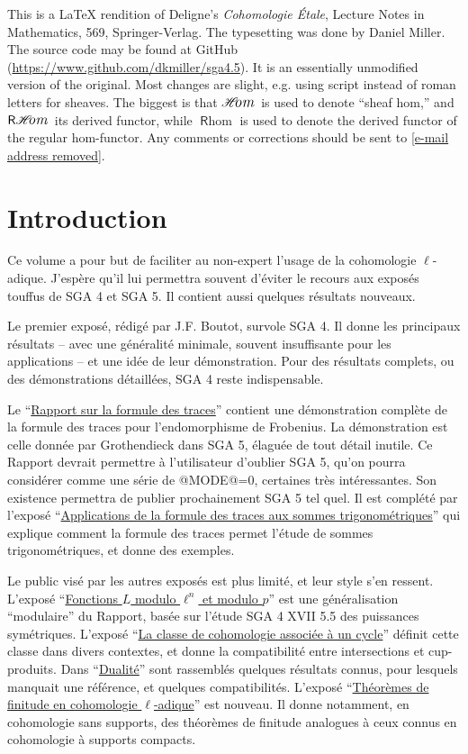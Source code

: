 \documentclass[oneside]{book}
\makeatletter
\providecommand\calligra{\itshape}}
\DeclareMathOperator{\Hom}{\mathscr{H}\text{\kern -3pt {\calligra\large om}}\,} %
\DeclareMathOperator{\rHom}{\mathsf{R}\vspace{-1pt}\mathscr{H}\text{\kern -3pt {\calligra\large om}}\,}
\DeclareMathOperator{\rhom}{\mathsf{R}\hom}
\theoremstyle{sga-source}
\theoremstyle{sga-source-dash}
\theoremstyle{sga-source-dotdash}
\theoremstyle{sga-source-number-note-dash}
\theoremstyle{sga-source-note-number-dotdash}
\theoremstyle{sga-source-example-dotdash}
\theoremstyle{sga-source-inline-number}
\theoremstyle{sga-source-bare-number}
\theoremstyle{sga-source}
\providecommand\EditionMode{@MODE@}
\providecommand\EditionLanguage{fr}
\DeclareRobustCommand{\EditionVariantMark}[2]{%
  \ifx\relax#1\relax\else
    \ifmmode
      \hbox{\raisebox{0.7ex}{\normalfont\scriptsize\color{EditionAppColor}%
        \hyperlink{apparatus:#1}{\EditionShortOccurrence{#1}}}}%
    \else
      \textsuperscript{\normalfont\scriptsize\color{EditionAppColor}%
        \hyperlink{apparatus:#1}{\EditionShortOccurrence{#1}}}%
    \fi
  \fi}
\def\EditionShortOccurrence#1{\expandafter\EditionShortOccurrenceAux#1\@nil}
\def\EditionShortOccurrenceAux#1-#2\@nil{\number#2\relax}
\DeclareRobustCommand{\var}[4][]{%
  \ifnum\EditionMode=0\relax
    \expandafter\@firstoftwo
  \else
    \expandafter\@secondoftwo
  \fi
  {#2}{\ifnum\EditionMode=1\relax\EditionVariantMark{#1}{#4}\fi#3}}
\providecommand\CurrentPrintPage{}
\DeclareRobustCommand{\PrintPage}[1]{%
  \gdef\CurrentPrintPage{#1}%
  \hypertarget{printpage:\EditionLanguage:#1}{}%
  \marginnote{\normalfont\sffamily\scriptsize\color{black!65}%
    \ifnum\EditionMode=2\relax#1\else[p.~#1]\fi}}
\DeclareRobustCommand{\MathPage}[1]{\PrintPage{#1}}
\def\EditionPDFVar[#1]#2#3#4{\ifnum\EditionMode=0\relax\expandafter\@firstoftwo\else\expandafter\@secondoftwo\fi{#2}{#3}}
\let\var\EditionPDFVar
\def\PrintPage#1{}\def\MathPage#1{}%
\def\EditionVariantMark#1#2{}}
\makeatother
\begin{document}
This is a \LaTeX{} rendition of Deligne's \emph{Cohomologie \'Etale}, Lecture 
Notes in Mathematics, 569, Springer-Verlag. The 
typesetting was done by Daniel Miller. The source code may be found at 
GitHub (\url{https://www.github.com/dkmiller/sga4.5}). It is an essentially 
unmodified version of the original. Most changes are slight, e.g. using 
script instead of roman letters for sheaves. The biggest is that 
$\Hom$ is used to denote ``sheaf hom,'' and $\rHom$ its derived functor, while 
$\rhom$ is used to denote the derived functor of the regular hom-functor. Any 
comments or corrections should be sent to \url{[e-mail address removed]}.
\clearpage\fi
\clearpage{}\hypersetup{pageanchor=true}


\chapter*{Introduction}\PrintPage{III}

Ce volume a pour but de faciliter au non-expert l'usage de la 
cohomologie $\ell$-adique. J'espère qu'il lui permettra souvent d'éviter le 
recours aux exposés touffus de SGA 4 et SGA 5. Il contient aussi quelques 
résultats nouveaux. 

Le premier exposé, rédigé par J.F. Boutot, survole SGA 4. Il donne les 
principaux résultats -- avec une généralité minimale, souvent 
insuffisante pour les applications -- et une idée de leur démonstration. Pour 
des résultats complets, ou des démonstrations détaillées, SGA 4 reste 
indispensable. 

Le ``\hyperref[II]{Rapport sur la formule des traces}'' contient une démonstration complète de 
la formule des traces pour l'endomorphisme de Frobenius. La démonstration est 
celle donnée par Grothendieck dans SGA 5, élaguée de tout détail inutile. Ce 
Rapport devrait permettre à l'utilisateur d'oublier SGA 5, qu'on pourra 
considérer comme une série de \var[FR-0001]{digression}{digressions}{SGA45-CORR-0001}, certaines très intéressantes. Son 
existence permettra de publier prochainement SGA 5 tel quel. Il est complété 
par l'exposé ``\hyperref[VI]{Applications de la formule des traces aux sommes trigonométriques}'' qui explique comment la formule des traces permet 
l'étude de sommes trigonométriques, et donne des exemples. 

Le public visé par les autres exposés est plus limité, et leur style s'en 
ressent. L'exposé ``\hyperref[III]{Fonctions $L$ modulo $\ell^n$ et modulo $p$}'' est une 
généralisation ``modulaire'' du Rapport, basée sur l'étude SGA 4 XVII 5.5 des 
puissances symétriques. L'exposé ``\hyperref[IV]{La classe de cohomologie associée à un cycle}'' 
définit cette classe dans divers contextes, et donne la compatibilité 
entre intersections et cup-produits. Dans ``\hyperref[V]{Dualité}'' sont rassemblés 
quelques résultats connus, pour lesquels manquait une référence, et quelques 
compatibilités. L'exposé ``\hyperref[VII]{Théorèmes de finitude en cohomologie $\ell$-adique}'' 
est nouveau. Il donne notamment, en cohomologie sans supports, des théorèmes de 
finitude analogues à ceux connus en cohomologie à supports compacts. 
\end{document}

